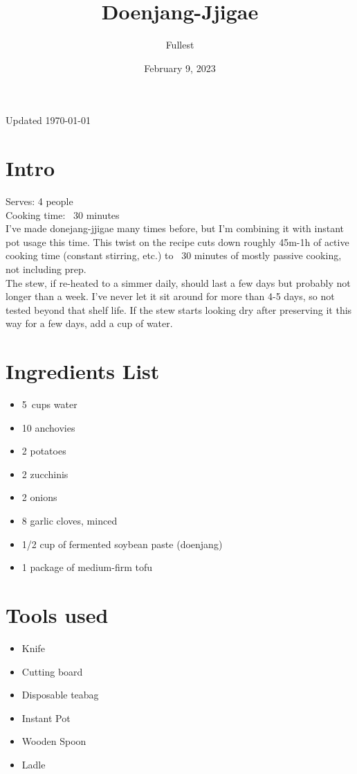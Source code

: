 \documentclass{article}
\title{\textbf{Doenjang-Jjigae}}
\author{Fullest}
\date{February 9, 2023}
\let\US\SI
\begin{document}
\maketitle
\thispagestyle{empty}

\begin{multicols}{2}


Updated \today
\section{Intro}
Serves: 4 people\\
Cooking time: ~30 minutes\\

I've made donejang-jjigae\cite{MAANGCHI} many times before, but I'm combining it with instant pot\cite{FISHSTOCK} usage this time. This twist on the recipe cuts down roughly 45m-1h of active cooking time (constant stirring, etc.) to ~30 minutes of mostly passive cooking, not including prep.\\

The stew, if re-heated to a simmer daily, should last a few days but probably not longer than a week. I've never let it sit around for more than 4-5 days, so not tested beyond that shelf life. If the stew starts looking dry after preserving it this way for a few days, add a cup of water.

\section{Ingredients List}
\begin{itemize}
	\item \US{5}{cups} water
	\item 10 anchovies
	\item 2 potatoes
	\item 2 zucchinis
	\item 2 onions
	\item 8 garlic cloves, minced
	\item 1/2 cup of fermented soybean paste (doenjang)
	\item 1 package of medium-firm tofu
\end{itemize}

\section{Tools used}
\begin{itemize}
	\item Knife
	\item Cutting board
	\item Disposable teabag
	\item Instant Pot
	\item Wooden Spoon
	\item Ladle
\end{itemize}
\vfill\null
\columnbreak


\end{multicols}
\end{document}
